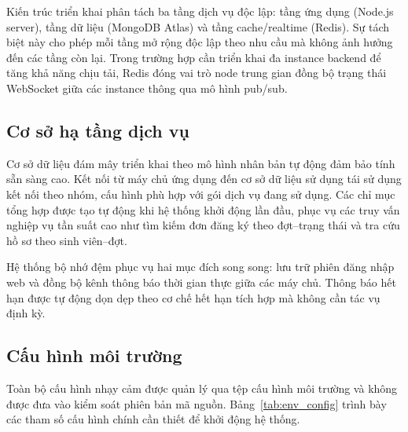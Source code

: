 \documentclass[../DoAn.tex]{subfiles}
\begin{document}
Kiến trúc triển khai phân tách ba tầng dịch vụ độc lập: tầng ứng dụng (Node.js
server), tầng dữ liệu (MongoDB Atlas) và tầng cache/realtime (Redis). Sự tách
biệt này cho phép mỗi tầng mở rộng độc lập theo nhu cầu mà không ảnh hưởng đến
các tầng còn lại. Trong trường hợp cần triển khai đa instance backend để tăng
khả năng chịu tải, Redis đóng vai trò node trung gian đồng bộ trạng thái WebSocket
giữa các instance thông qua mô hình pub/sub.

\subsection*{Cơ sở hạ tầng dịch vụ}

Cơ sở dữ liệu đám mây triển khai theo mô hình nhân bản tự động đảm bảo tính
sẵn sàng cao. Kết nối từ máy chủ ứng dụng đến cơ sở dữ liệu sử dụng tái sử
dụng kết nối theo nhóm, cấu hình phù hợp với gói dịch vụ đang sử dụng. Các
chỉ mục tổng hợp được tạo tự động khi hệ thống khởi động lần đầu, phục vụ các
truy vấn nghiệp vụ tần suất cao như tìm kiếm đơn đăng ký theo đợt--trạng thái
và tra cứu hồ sơ theo sinh viên--đợt.

Hệ thống bộ nhớ đệm phục vụ hai mục đích song song: lưu trữ phiên đăng nhập
web và đồng bộ kênh thông báo thời gian thực giữa các máy chủ. Thông báo hết
hạn được tự động dọn dẹp theo cơ chế hết hạn tích hợp mà không cần tác vụ định
kỳ.

\subsection*{Cấu hình môi trường}

Toàn bộ cấu hình nhạy cảm được quản lý qua tệp cấu hình môi trường và không
được đưa vào kiểm soát phiên bản mã nguồn. Bảng~\ref{tab:env_config} trình bày
các tham số cấu hình chính cần thiết để khởi động hệ thống.
\end{document}
